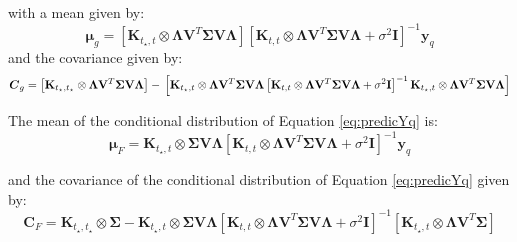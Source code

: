with a mean given by:
\begin{equation} \label{eq:prediction_MuG}
  \boldsymbol{\mu}_g = 
    \left[ \mathbf{K}_{t_\star,t} \otimes \boldsymbol{\Lambda} \mathbf{V}^T\boldsymbol{\Sigma} \mathbf{V} \boldsymbol{\Lambda}  \right] 
    \left[ \mathbf{K}_{t,t} \otimes \boldsymbol{\Lambda} \mathbf{V}^T\boldsymbol{\Sigma} \mathbf{V} \boldsymbol{\Lambda} + \sigma^2 \mathbf{I} \right]^{-1}\mathbf{y}_q
\end{equation}
and the covariance given by:
\begin{equation} \label{eq:prediction_Cg}
\boldsymbol{C}_g = 
    \left[ \mathbf{K}_{t_\star,t_\star} \otimes \boldsymbol{\Lambda} \mathbf{V}^T\boldsymbol{\Sigma} \mathbf{V} \boldsymbol{\Lambda}  \right] - \\
    \left[ \mathbf{K}_{t_\star,t} \otimes \boldsymbol{\Lambda} \mathbf{V}^T\boldsymbol{\Sigma} \mathbf{V} \boldsymbol{\Lambda}  
    \left[ \mathbf{K}_{t,t} \otimes \boldsymbol{\Lambda} \mathbf{V}^T\boldsymbol{\Sigma} \mathbf{V} \boldsymbol{\Lambda} + \sigma^2 \mathbf{I} \right]^{-1} 
    \mathbf{K}_{t_\star,t} \otimes \boldsymbol{\Lambda} \mathbf{V}^T\boldsymbol{\Sigma} \mathbf{V} \boldsymbol{\Lambda} \right]
\end{equation}

The mean of the conditional distribution of Equation \ref{eq:predicYq} %
is:
\begin{equation} \label{eq:prediction_MuF}
  \boldsymbol{\mu}_F = 
    \mathbf{K}_{t_\star,t} \otimes \boldsymbol{\Sigma} \mathbf{V} \boldsymbol{\Lambda}
    \left[ \mathbf{K}_{t,t} \otimes \boldsymbol{\Lambda} \mathbf{V}^T\boldsymbol{\Sigma} \mathbf{V} \boldsymbol{\Lambda} + \sigma^2 \mathbf{I} \right]^{-1}\mathbf{y}_q
\end{equation}

and the covariance of the conditional distribution of Equation \ref{eq:predicYq} %
given by:
\begin{equation} \label{eq:prediction_CF}
  \boldsymbol{C}_F = 
    \mathbf{K}_{t_\star,t_\star} \otimes \boldsymbol{\Sigma} -
    \mathbf{K}_{t_\star,t} \otimes \boldsymbol{\Sigma}\mathbf{V} \boldsymbol{\Lambda}
    \left[ \mathbf{K}_{t,t} \otimes \boldsymbol{\Lambda} \mathbf{V}^T\boldsymbol{\Sigma} \mathbf{V} \boldsymbol{\Lambda} + \sigma^2 \mathbf{I} \right]^{-1} 
    \left[ \mathbf{K}_{t_\star,t} \otimes \boldsymbol{\Lambda} \mathbf{V}^T\boldsymbol{\Sigma}\right]
\end{equation}

